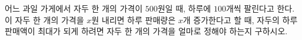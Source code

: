 어느 과일 가게에서 자두 한 개의 가격이 $500$원일 때, 하루에 $100$개씩 팔린다고 한다. 이 자두 한 개의 가격을 $x$원 내리면 하루 판매량은 $x$개 증가한다고 할 때, 자두의 하루 판매액이 최대가 되게 하려면 자두 한 개의 가격을 얼마로 정해야 하는지 구하시오.
